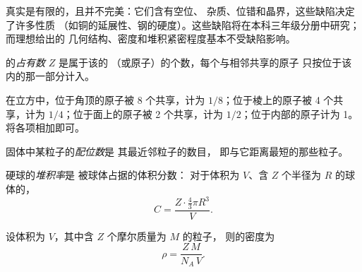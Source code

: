\begin{remark}[真实晶体]\label{rem:b1:crystals-metals:real}
真实是有限的，且并不完美：它们含有空位、
杂质、位错和晶界，这些缺陷决定了许多性质
（如铜的延展性、钢的硬度）。这些缺陷将在本科三年级分册中研究；
而理想给出的
几何结构、密度和堆积紧密程度基本不受缺陷影响。
\end{remark}

\begin{definition}[晶胞的占有数]\label{def:b1:crystals-metals:multiplicity}
的\emph{占有数} $Z$ 是属于该的
（或原子）的个数，每个与相邻共享的原子
只按位于该内的那一部分计入。
\end{definition}

\begin{method}[数出晶胞中的原子数]\label{met:b1:crystals-metals:count}
在立方中，位于角顶的原子被 8 个共享，计为
$1/8$；位于棱上的原子被 4 个共享，计为 $1/4$；位于面上的原子被
2 个共享，计为 $1/2$；位于内部的原子计为 1。将各项相加即可。
\end{method}

\begin{definition}[配位数]\label{def:b1:crystals-metals:coordination}
固体中某粒子的\emph{配位数}是
其最近邻粒子的数目，
即与它距离最短的那些粒子。
\end{definition}

\begin{definition}[堆积率]\label{def:b1:crystals-metals:compactness}
硬球的\emph{堆积率}是
被球体占据的体积分数：
对于体积为 $V$、含 $Z$ 个半径为 $R$ 的球体的，
\[
  C = \frac{Z \cdot \frac43 \pi R^3}{V} .
\]
\end{definition}

\begin{proposition}[由晶胞求密度]\label{prop:b1:crystals-metals:density}
设体积为 $V$，其中含 $Z$ 个摩尔质量为 $M$ 的粒子，
则的密度为
\[
  \rho = \frac{Z\,M}{N_A\,V} .
\]
\end{proposition}

